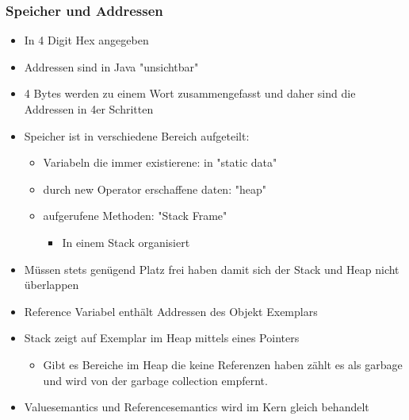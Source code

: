 \documentclass[11pt]{article}
\begin{document}
\subsubsection{Speicher und Addressen}
\label{sec:org583dbc5}
\begin{itemize}
\item In 4 Digit Hex angegeben\\
\item Addressen sind in Java "unsichtbar"\\
\item 4 Bytes werden zu einem Wort zusammengefasst und daher sind die Addressen in 4er Schritten\\
\item Speicher ist in verschiedene Bereich aufgeteilt:\\
\begin{itemize}
\item Variabeln die immer existierene: in "static data"\\
\item durch new Operator erschaffene daten: "heap"\\
\item aufgerufene Methoden: "Stack Frame"\\
\begin{itemize}
\item In einem Stack organisiert\\
\end{itemize}
\end{itemize}
\item Müssen stets genügend Platz frei haben damit sich der Stack und Heap nicht überlappen\\
\item Reference Variabel enthält Addressen des Objekt Exemplars\\
\item Stack zeigt auf Exemplar im Heap mittels eines Pointers\\
\begin{itemize}
\item Gibt es Bereiche im Heap die keine Referenzen haben zählt es als garbage und wird von der garbage collection empfernt.\\
\end{itemize}
\item Valuesemantics und Referencesemantics wird im Kern gleich behandelt\\
\end{itemize}
\end{document}
